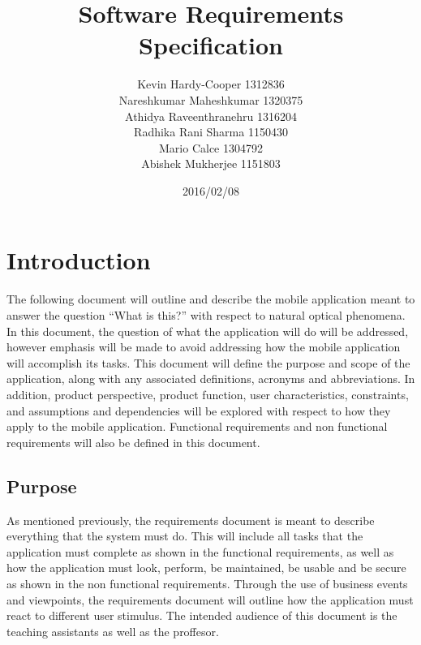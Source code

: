 \documentclass[]{article}
\begin{document}
\begin{titlepage}

\title{Software Requirements Specification}
\author{Kevin Hardy-Cooper 1312836\\
		Nareshkumar Maheshkumar 1320375\\
		Athidya Raveenthranehru 1316204\\
		Radhika Rani Sharma	1150430\\
		Mario Calce 1304792\\
		Abishek Mukherjee 1151803 }
\date{2016/02/08}

\maketitle

\end{titlepage}
\tableofcontents                  \newpage    

	

\section{Introduction}
\label{sec:introduction}


 The following document will outline and describe the mobile application meant to answer the question ``What is this?'' with respect to natural optical phenomena.  In this document, the question of what the application will do will be addressed, however emphasis will be made to avoid addressing how the mobile application will accomplish its tasks. This document will define the purpose and scope of the application, along with any associated definitions, acronyms and abbreviations. In addition, product perspective, product function, user characteristics, constraints, and assumptions and dependencies will be explored with respect to how they apply to the mobile application. Functional requirements and non functional requirements will also be defined in this document.

\subsection{Purpose}
\label{sub:purpose}

 As mentioned previously, the requirements document is meant to describe everything that the system must do. This will include all tasks that the application must complete as shown in the functional requirements, as well as how the application must look, perform, be maintained, be usable and be secure as shown in the non functional requirements. Through the use of business events and viewpoints, the requirements document will outline how the application must react to different user stimulus. The intended audience of this document is the teaching assistants as well as the proffesor. 
\end{document}

